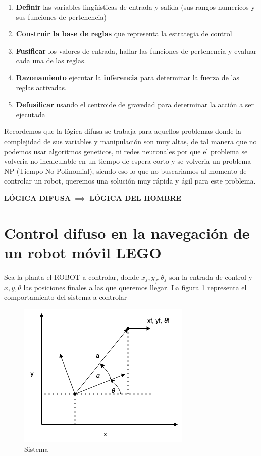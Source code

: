 \documentclass[oneside,onecolumn]{article}
\begin{document}
\begin{enumerate}
\item \textbf{Definir} las variables lingüisticas de entrada y salida (sus rangos numericos y sus funciones de pertenencia)
\item \textbf{Construir la base de reglas} que representa la estrategia de control
\item \textbf{Fusificar} los valores  de entrada, hallar las funciones de pertenencia y evaluar cada una de las reglas.
\item \textbf{Razonamiento} ejecutar la \textbf{inferencia} para determinar la fuerza de las reglas activadas.
\item \textbf{Defusificar} usando el centroide de gravedad para determinar la acción a ser ejecutada
\end{enumerate}

Recordemos que la lógica difusa se trabaja para aquellos problemas donde la complejidad de sus variables y manipulación son muy altas, de tal manera que no podemos usar algoritmos geneticos, ni redes neuronales por que el problema se volveria no incalculable en un tiempo de espera corto y se volveria un problema NP (Tiempo No Polinomial), siendo eso lo que no buscariamos al momento de controlar un robot, queremos una solución muy rápida y ágil para este problema.\\

\begin{center}
  \textbf{LÓGICA DIFUSA} $\implies$ \textbf{LÓGICA DEL HOMBRE}
\end{center}



\section{Control difuso en la navegación de un robot móvil LEGO}

Sea la planta el ROBOT a controlar, donde $x_f, y_f, \theta_{f}$ son la entrada de control y $x, y, \theta$ las posiciones finales a las que queremos llegar. La figura 1 representa el comportamiento del sistema a controlar

\begin{figure}[h]
  \centering
  \includegraphics[scale=0.7]{graficos/grafico.png}
  \caption{Sistema}
\end{figure}
\end{document}

